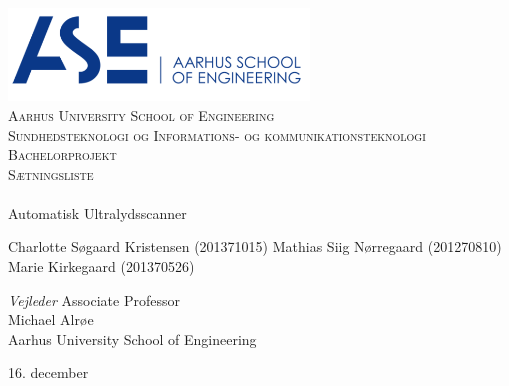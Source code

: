 \begin{titlingpage}
\begin{center}

~ \\[3cm]

\includegraphics[width=0.6\textwidth]{figurer/ASE}~\\[1cm]

\textsc{\LARGE Aarhus University School of Engineering}\\[1.5cm]

\textsc{\Large Sundhedsteknologi og Informations- og kommunikationsteknologi}\\

\textsc{\Large Bachelorprojekt}\\[0.5cm]

\textsc{\Large Sætningsliste} \\[1cm]

\noindent\makebox[\linewidth]{\rule{\textwidth}{0.4pt}}\\
[0.5cm]{\Huge Automatisk Ultralydsscanner}
\noindent\makebox[\linewidth]{\rule{\textwidth}{0.4pt}}

\end{center}

Charlotte Søgaard Kristensen (201371015) \newline
Mathias Siig Nørregaard  (201270810)\newline		 
Marie Kirkegaard (201370526) \newline  


\textit{Vejleder} \newline
Associate Professor\\
Michael Alrøe\\
Aarhus University School of Engineering


\vfill

\begin{center}
{\large 16. december}
\end{center}

\end{titlingpage}
